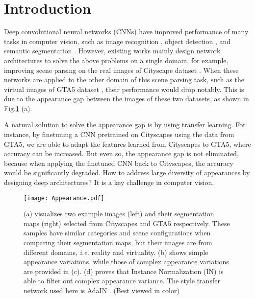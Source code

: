 \documentclass[runningheads]{llncs}
\newcommand{\ie} {\emph{i.e. }}
\begin{document}
\section{Introduction}

Deep convolutional neural networks (CNNs) have improved performance of many tasks in computer vision, such as image recognition \cite{krizhevsky2012imagenet}, object detection \cite{ren2015faster}, and semantic segmentation \cite{chen2017deeplab}.
However, existing works mainly design network architectures to solve the above problems on a single domain, for example, improving scene parsing on the real images of Cityscape dataset \cite{cordts2016cityscapes,pan2018SCNN}.
When these networks are applied to the other domain of this scene parsing task, such as the virtual images of GTA5 dataset \cite{Richter_2016_ECCV}, their performance would drop notably.
This is due to the appearance gap between the images of these two datasets, as shown in Fig.\ref{fig:intro} (a).


A natural solution to solve the appearance gap is by using transfer learning. For instance, by finetuning a CNN pretrained on Cityscapes using the data from GTA5, we are able to adapt the features learned from Cityscapes to GTA5, where accuracy can be increased.
But even so, the appearance gap is not eliminated, because when applying the finetuned CNN back to Cityscapes, the accuracy would be significantly degraded.
How to address large diversity of appearances by designing deep architectures?
It is a key challenge in computer vision.


\begin{figure}[t]
\centering
\texttt{[image: Appearance.pdf]}
\caption{(a) visualizes two example images (left) and their segmentation maps (right) selected from Cityscapes \cite{cordts2016cityscapes} and GTA5 \cite{Richter_2016_ECCV} respectively. These samples have similar categories and scene configurations when comparing their segmentation maps, but their images are from different domains, \ie reality and virtuality. (b) shows simple appearance variations, while those of complex appearance variations are provided in (c). (d) proves that Instance Normalization (IN) is able to filter out complex appearance variance. The style transfer network used here is AdaIN \cite{huang2017arbitrary}. 
(Best viewed in color) }
\label{fig:intro}
\end{figure}
\end{document}

